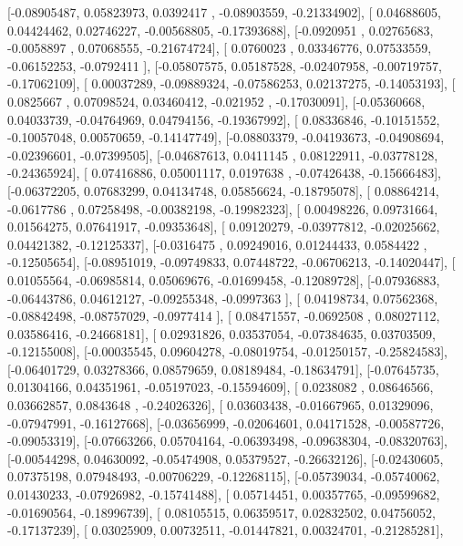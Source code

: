 \documentclass{article}
\begin{document}
       [-0.08905487,  0.05823973,  0.0392417 , -0.08903559, -0.21334902],
       [ 0.04688605,  0.04424462,  0.02746227, -0.00568805, -0.17393688],
       [-0.0920951 ,  0.02765683, -0.0058897 ,  0.07068555, -0.21674724],
       [ 0.0760023 ,  0.03346776,  0.07533559, -0.06152253, -0.0792411 ],
       [-0.05807575,  0.05187528, -0.02407958, -0.00719757, -0.17062109],
       [ 0.00037289, -0.09889324, -0.07586253,  0.02137275, -0.14053193],
       [ 0.0825667 ,  0.07098524,  0.03460412, -0.021952  , -0.17030091],
       [-0.05360668,  0.04033739, -0.04764969,  0.04794156, -0.19367992],
       [ 0.08336846, -0.10151552, -0.10057048,  0.00570659, -0.14147749],
       [-0.08803379, -0.04193673, -0.04908694, -0.02396601, -0.07399505],
       [-0.04687613,  0.0411145 ,  0.08122911, -0.03778128, -0.24365924],
       [ 0.07416886,  0.05001117,  0.0197638 , -0.07426438, -0.15666483],
       [-0.06372205,  0.07683299,  0.04134748,  0.05856624, -0.18795078],
       [ 0.08864214, -0.0617786 ,  0.07258498, -0.00382198, -0.19982323],
       [ 0.00498226,  0.09731664,  0.01564275,  0.07641917, -0.09353648],
       [ 0.09120279, -0.03977812, -0.02025662,  0.04421382, -0.12125337],
       [-0.0316475 ,  0.09249016,  0.01244433,  0.0584422 , -0.12505654],
       [-0.08951019, -0.09749833,  0.07448722, -0.06706213, -0.14020447],
       [ 0.01055564, -0.06985814,  0.05069676, -0.01699458, -0.12089728],
       [-0.07936883, -0.06443786,  0.04612127, -0.09255348, -0.0997363 ],
       [ 0.04198734,  0.07562368, -0.08842498, -0.08757029, -0.0977414 ],
       [ 0.08471557, -0.0692508 ,  0.08027112,  0.03586416, -0.24668181],
       [ 0.02931826,  0.03537054, -0.07384635,  0.03703509, -0.12155008],
       [-0.00035545,  0.09604278, -0.08019754, -0.01250157, -0.25824583],
       [-0.06401729,  0.03278366,  0.08579659,  0.08189484, -0.18634791],
       [-0.07645735,  0.01304166,  0.04351961, -0.05197023, -0.15594609],
       [ 0.0238082 ,  0.08646566,  0.03662857,  0.0843648 , -0.24026326],
       [ 0.03603438, -0.01667965,  0.01329096, -0.07947991, -0.16127668],
       [-0.03656999, -0.02064601,  0.04171528, -0.00587726, -0.09053319],
       [-0.07663266,  0.05704164, -0.06393498, -0.09638304, -0.08320763],
       [-0.00544298,  0.04630092, -0.05474908,  0.05379527, -0.26632126],
       [-0.02430605,  0.07375198,  0.07948493, -0.00706229, -0.12268115],
       [-0.05739034, -0.05740062,  0.01430233, -0.07926982, -0.15741488],
       [ 0.05714451,  0.00357765, -0.09599682, -0.01690564, -0.18996739],
       [ 0.08105515,  0.06359517,  0.02832502,  0.04756052, -0.17137239],
       [ 0.03025909,  0.00732511, -0.01447821,  0.00324701, -0.21285281],
\end{document}
